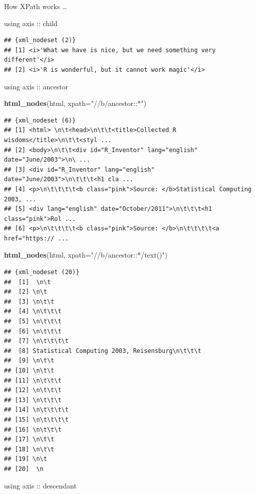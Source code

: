 \documentclass[ignorenonframetext,]{beamer}
\newenvironment{Shaded}{\begin{snugshade}}{\end{snugshade}}
\newcommand{\KeywordTok}[1]{\textcolor[rgb]{0.13,0.29,0.53}{\textbf{{#1}}}}
\newcommand{\DataTypeTok}[1]{\textcolor[rgb]{0.13,0.29,0.53}{{#1}}}
\newcommand{\StringTok}[1]{\textcolor[rgb]{0.31,0.60,0.02}{{#1}}}
\newcommand{\NormalTok}[1]{{#1}}
\begin{document}
\begin{frame}[fragile]{How XPath works \ldots{}}
\begin{block}{using axis :: child}
\begin{verbatim}
## {xml_nodeset (2)}
## [1] <i>'What we have is nice, but we need something very different'</i>
## [2] <i>'R is wonderful, but it cannot work magic'</i>
\end{verbatim}

\end{block}

\begin{block}{using axis :: ancestor}

\begin{Shaded}
\begin{Highlighting}[]
\KeywordTok{html_nodes}\NormalTok{(html, }\DataTypeTok{xpath=}\StringTok{"//b/ancestor::*"}\NormalTok{)}
\end{Highlighting}
\end{Shaded}

\begin{verbatim}
## {xml_nodeset (6)}
## [1] <html> \n\t<head>\n\t\t<title>Collected R wisdoms</title>\n\t\t<styl ...
## [2] <body>\n\t\t<div id="R_Inventor" lang="english" date="June/2003">\n\ ...
## [3] <div id="R_Inventor" lang="english" date="June/2003">\n\t\t\t<h1 cla ...
## [4] <p>\n\t\t\t\t<b class="pink">Source: </b>Statistical Computing 2003, ...
## [5] <div lang="english" date="October/2011">\n\t\t\t<h1 class="pink">Rol ...
## [6] <p>\n\t\t\t\t<b class="pink">Source: </b>\n\t\t\t\t<a href="https:// ...
\end{verbatim}

\begin{Shaded}
\begin{Highlighting}[]
\KeywordTok{html_nodes}\NormalTok{(html, }\DataTypeTok{xpath=}\StringTok{"//b/ancestor::*/text()"}\NormalTok{)}
\end{Highlighting}
\end{Shaded}

\begin{verbatim}
## {xml_nodeset (20)}
##  [1]  \n\t
##  [2] \n\t
##  [3] \n\t\t
##  [4] \n\t\t\t
##  [5] \n\t\t\t
##  [6] \n\t\t\t
##  [7] \n\t\t\t\t
##  [8] Statistical Computing 2003, Reisensburg\n\t\t\t
##  [9] \n\t\t
## [10] \n\t\t
## [11] \n\t\t\t
## [12] \n\t\t\t
## [13] \n\t\t\t
## [14] \n\t\t\t\t
## [15] \n\t\t\t\t
## [16] \n\t\t\t
## [17] \n\t\t
## [18] \n\t\t
## [19] \n\t
## [20]  \n
\end{verbatim}

\end{block}

\begin{block}{using axis :: descendant}


\end{block}
\end{frame}
\end{document}
